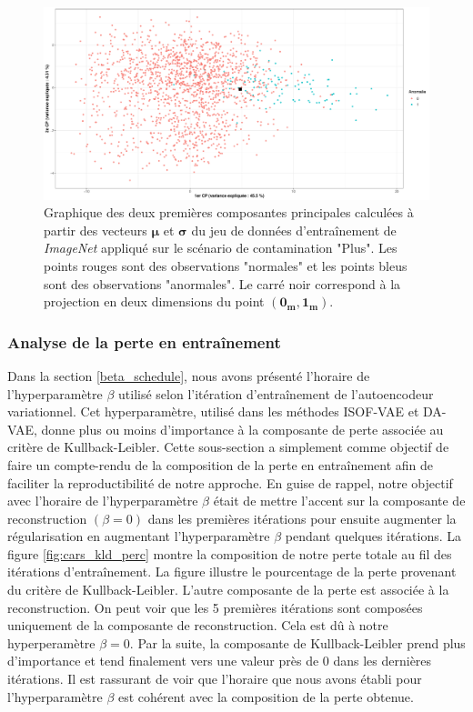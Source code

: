 \begin{figure}[htb]
	\centering
	\centering\includegraphics[width=\linewidth]{images/plot_pca_cars}
	\caption[Graphique des deux premières composantes principales calculées à partir des vecteurs $\boldsymbol{\mu}$ et $\boldsymbol{\sigma}$ du jeu de données d'entraînement de \textit{ImageNet}.]{Graphique des deux premières composantes principales calculées à partir des vecteurs $\boldsymbol{\mu}$ et $\boldsymbol{\sigma}$ du jeu de données d'entraînement de \textit{ImageNet} appliqué sur le scénario de contamination "Plus". Les points rouges sont des observations "normales" et les points bleus sont des observations "anormales". Le carré noir correspond à la projection en deux dimensions du point $(\boldsymbol{0_{m}}, \boldsymbol{1_{m}})$.}
	\label{fig:pca_cars}
\end{figure}


\subsubsection{Analyse de la perte en entraînement}

Dans la section \ref{beta_schedule}, nous avons présenté l'horaire de l'hyperparamètre $\beta$ utilisé selon l'itération d'entraînement de l'autoencodeur variationnel. Cet hyperparamètre, utilisé dans les méthodes ISOF-VAE et DA-VAE, donne plus ou moins d'importance à la composante de perte associée au critère de Kullback-Leibler. Cette sous-section a simplement comme objectif de faire un compte-rendu de la composition de la perte en entraînement afin de faciliter la reproductibilité de notre approche. En guise de rappel, notre objectif avec l'horaire de l'hyperparamètre $\beta$ était de mettre l'accent sur la composante de reconstruction $(\beta = 0)$ dans les premières itérations pour ensuite augmenter la régularisation en augmentant l'hyperparamètre $\beta$ pendant quelques itérations. La figure \ref{fig:cars_kld_perc} montre la composition de notre perte totale au fil des itérations d'entraînement. La figure illustre le pourcentage de la perte provenant du critère de Kullback-Leibler. L'autre composante de la perte est associée à la reconstruction. On peut voir que les 5 premières itérations sont composées uniquement de la composante de reconstruction. Cela est dû à notre hyperperamètre $\beta=0$. Par la suite, la composante de Kullback-Leibler prend plus d'importance et tend finalement vers une valeur près de 0 dans les dernières itérations. Il est rassurant de voir que l'horaire que nous avons établi pour l'hyperparamètre $\beta$ est cohérent avec la composition de la perte obtenue.

